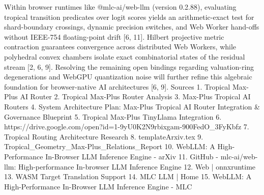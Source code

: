 Within browser runtimes like @mlc-ai/web-llm (version 0.2.88), evaluating tropical transition predicates over logit scores yields an arithmetic-exact test for shard-boundary crossings, dynamic precision switches, and Web Worker hand-offs without IEEE-754 floating-point drift [6, 11]. Hilbert projective metric contraction guarantees convergence across distributed Web Workers, while polyhedral convex chambers isolate exact combinatorial states of the residual stream [2, 6, 9]. Resolving the remaining open bindings regarding valuation-ring degenerations and WebGPU quantization noise will further refine this algebraic foundation for browser-native AI architectures [6, 9].
Sources
1. Tropical Max-Plus AI Router
2. Tropical Max-Plus Router Analysis
3. Max-Plus Tropical AI Routers
4. System Architecture Plan: Max-Plus Tropical AI Router Integration & Governance Blueprint
5. Tropical Max-Plus TinyLlama Integration
6. https://drive.google.com/open?id=1-9yU0K2N9rbixgam-900FedO_3FyKbfz
7. Tropical Routing Architecture Research
8. templateArxiv.tex
9. Tropical_Geometry_Max-Plus_Relations_Report
10. WebLLM: A High-Performance In-Browser LLM Inference Engine - arXiv
11. GitHub - mlc-ai/web-llm: High-performance In-browser LLM Inference Engine
12. Web | onnxruntime
13. WASM Target Translation Support
14. MLC LLM | Home
15. WebLLM: A High-Performance In-Browser LLM Inference Engine - MLC
